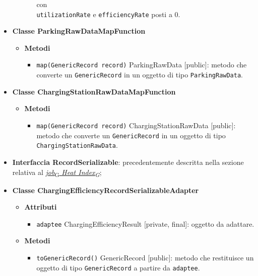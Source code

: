 \begin{itemize}
\begin{itemize}
\begin{itemize}
			                  con \\\texttt{utilizationRate} e \texttt{efficiencyRate} posti a 0.
		            \end{itemize}
	      \end{itemize}
	\item \textbf{Classe ParkingRawDataMapFunction}
	      \begin{itemize}
		      \item \textbf{Metodi}
		            \begin{itemize}
			            \item \texttt{map(GenericRecord record)} ParkingRawData [public]: metodo che converte un \texttt{GenericRecord} in un oggetto di tipo \texttt{ParkingRawData}.
		            \end{itemize}
	      \end{itemize}
	\item \textbf{Classe ChargingStationRawDataMapFunction}
	      \begin{itemize}
		      \item \textbf{Metodi}
		            \begin{itemize}
			            \item \texttt{map(GenericRecord record)} ChargingStationRawData [public]: metodo che converte un \texttt{GenericRecord} in un oggetto di tipo \texttt{ChargingStationRawData}.
		            \end{itemize}
	      \end{itemize}
	\item \textbf{Interfaccia RecordSerializable}: precedentemente descritta nella sezione relativa al \hyperref[record_serializable]{\href{https://7last.github.io/docs/pb/documentazione-interna/glossario\#job}{\textit{\underline{job}}\textsubscript{G}}\underline{\textit{ \href{https://7last.github.io/docs/pb/documentazione-interna/glossario\#heat-index}{Heat Index\textsubscript{G}}}}};
	\item \textbf{Classe ChargingEfficiencyRecordSerializableAdapter}
	      \begin{itemize}
		      \item \textbf{Attributi}
		            \begin{itemize}
			            \item \texttt{adaptee} ChargingEfficiencyResult [private, final]: oggetto da adattare.
		            \end{itemize}
		      \item \textbf{Metodi}
		            \begin{itemize}
			            \item \texttt{toGenericRecord()} GenericRecord [public]: metodo che restituisce un oggetto di tipo \texttt{GenericRecord} a partire da \texttt{adaptee}.
		            \end{itemize}
	      \end{itemize}
\end{itemize}

